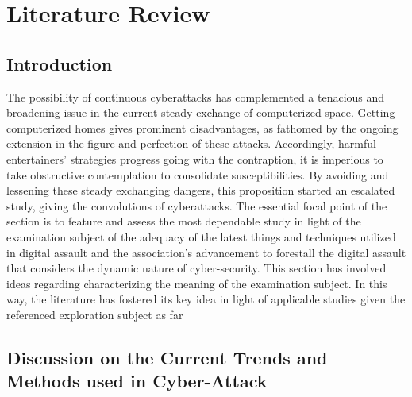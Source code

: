 \chapter{Literature Review}
\label{ch:lit_rev} %
\section{Introduction}
\label{sec:into_back}

The possibility of continuous cyberattacks has complemented a tenacious and broadening issue in 
the current steady exchange of computerized space. Getting computerized homes gives prominent 
disadvantages, as fathomed by the ongoing extension in the figure and perfection of these 
attacks. Accordingly, harmful entertainers' strategies progress going with the contraption, it 
is imperious to take obstructive contemplation to consolidate susceptibilities. By avoiding and 
lessening these steady exchanging dangers, this proposition started an escalated study, giving 
the convolutions of cyberattacks. The essential focal point of the section is to feature and 
assess the most dependable study in light of the examination subject of the adequacy of the 
latest things
and techniques utilized in digital assault and the association's advancement to forestall the 
digital assault that considers the dynamic nature of cyber-security. This section has involved 
ideas
regarding characterizing the meaning of the examination subject. In this way, the literature 
has fostered its key idea in light of applicable studies given the referenced exploration 
subject as far


\section{Discussion on the Current Trends and Methods used in Cyber-Attack}
\label{sec:into_back}
 
